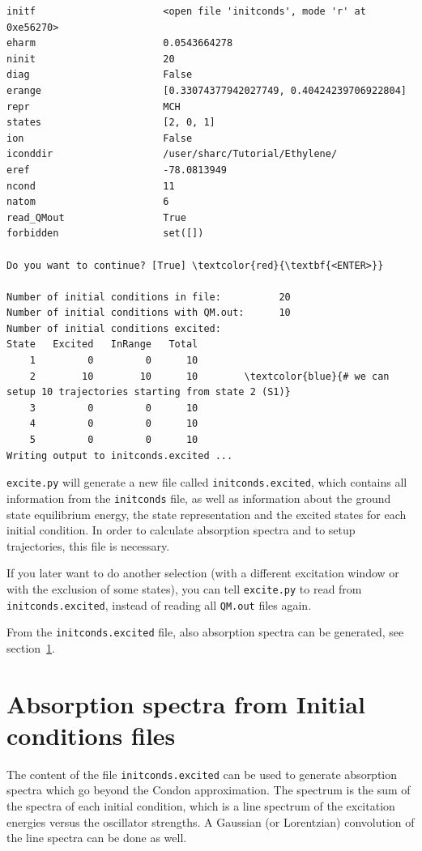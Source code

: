 \documentclass[a4paper,11pt,DIV=15,openany]{scrbook}
\newcommand{\ttt}[1]{\texttt{#1}}
\begin{document}
\begin{oframed}
\begin{Verbatim}[commandchars=\\\{\}]
initf                      <open file 'initconds', mode 'r' at 0xe56270>
eharm                      0.0543664278
ninit                      20
diag                       False
erange                     [0.33074377942027749, 0.40424239706922804]
repr                       MCH
states                     [2, 0, 1]
ion                        False
iconddir                   /user/sharc/Tutorial/Ethylene/
eref                       -78.0813949
ncond                      11
natom                      6
read_QMout                 True
forbidden                  set([])

Do you want to continue? [True] \textcolor{red}{\textbf{<ENTER>}}

Number of initial conditions in file:          20
Number of initial conditions with QM.out:      10
Number of initial conditions excited:
State   Excited   InRange   Total
    1         0         0      10
    2        10        10      10        \textcolor{blue}{# we can setup 10 trajectories starting from state 2 (S1)}
    3         0         0      10
    4         0         0      10
    5         0         0      10
Writing output to initconds.excited ...
\end{Verbatim}
\end{oframed}

\normalsize

\ttt{excite.py} will generate a new file called \ttt{initconds.excited}, which contains all information from the \ttt{initconds} file, as well as information about the ground state equilibrium energy, the state representation and the excited states for each initial condition. In order to calculate absorption spectra and to setup trajectories, this file is necessary.

If you later want to do another selection (with a different excitation window or with the exclusion of some states), you can tell \ttt{excite.py} to read from \ttt{initconds.excited}, instead of reading all \ttt{QM.out} files again. 

From the \ttt{initconds.excited} file, also absorption spectra can be generated, see section~\ref{sec:absspec}.




\clearpage
\section{Absorption spectra from Initial conditions files}\label{sec:absspec}

The content of the file \ttt{initconds.excited} can be used to generate absorption spectra which go beyond the Condon approximation. The spectrum is the sum of the spectra of each initial condition, which is a line spectrum of the excitation energies versus the oscillator strengths. A Gaussian (or Lorentzian) convolution of the line spectra can be done as well.
\end{document}
